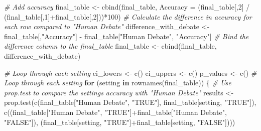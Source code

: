\documentclass[
]{article}
\newenvironment{Shaded}{\begin{snugshade}}{\end{snugshade}}
\newcommand{\AttributeTok}[1]{\textcolor[rgb]{0.77,0.63,0.00}{#1}}
\newcommand{\CommentTok}[1]{\textcolor[rgb]{0.56,0.35,0.01}{\textit{#1}}}
\newcommand{\ControlFlowTok}[1]{\textcolor[rgb]{0.13,0.29,0.53}{\textbf{#1}}}
\newcommand{\DecValTok}[1]{\textcolor[rgb]{0.00,0.00,0.81}{#1}}
\newcommand{\FunctionTok}[1]{\textcolor[rgb]{0.00,0.00,0.00}{#1}}
\newcommand{\NormalTok}[1]{#1}
\newcommand{\OtherTok}[1]{\textcolor[rgb]{0.56,0.35,0.01}{#1}}
\newcommand{\SpecialCharTok}[1]{\textcolor[rgb]{0.00,0.00,0.00}{#1}}
\newcommand{\StringTok}[1]{\textcolor[rgb]{0.31,0.60,0.02}{#1}}
\begin{document}
\begin{Shaded}
\begin{Highlighting}[]
\CommentTok{\# Add accuracy}
\NormalTok{final\_table }\OtherTok{\textless{}{-}} \FunctionTok{cbind}\NormalTok{(final\_table, }\AttributeTok{Accuracy =}\NormalTok{ (final\_table[,}\DecValTok{2}\NormalTok{] }\SpecialCharTok{/}\NormalTok{ (final\_table[,}\DecValTok{1}\NormalTok{]}\SpecialCharTok{+}\NormalTok{final\_table[,}\DecValTok{2}\NormalTok{]))}\SpecialCharTok{*}\DecValTok{100}\NormalTok{)}
\CommentTok{\# Calculate the difference in accuracy for each row compared to "Human Debate"}
\NormalTok{difference\_with\_debate }\OtherTok{\textless{}{-}}\NormalTok{ final\_table[,}\StringTok{"Accuracy"}\NormalTok{] }\SpecialCharTok{{-}}\NormalTok{ final\_table[}\StringTok{"Human Debate"}\NormalTok{, }\StringTok{"Accuracy"}\NormalTok{]}
\CommentTok{\# Bind the difference column to the final\_table}
\NormalTok{final\_table }\OtherTok{\textless{}{-}} \FunctionTok{cbind}\NormalTok{(final\_table, difference\_with\_debate)}

\CommentTok{\# Loop through each setting}
\NormalTok{ci\_lowers }\OtherTok{\textless{}{-}} \FunctionTok{c}\NormalTok{()}
\NormalTok{ci\_uppers }\OtherTok{\textless{}{-}} \FunctionTok{c}\NormalTok{()}
\NormalTok{p\_values }\OtherTok{\textless{}{-}} \FunctionTok{c}\NormalTok{()}
\CommentTok{\# Loop through each setting}
\ControlFlowTok{for}\NormalTok{ (setting }\ControlFlowTok{in} \FunctionTok{rownames}\NormalTok{(final\_table)) \{}
  \CommentTok{\# Use prop.test to compare the setting\textquotesingle{}s accuracy with "Human Debate"}
\NormalTok{  results }\OtherTok{\textless{}{-}} \FunctionTok{prop.test}\NormalTok{(}\FunctionTok{c}\NormalTok{(final\_table[}\StringTok{"Human Debate"}\NormalTok{, }\StringTok{"TRUE"}\NormalTok{], final\_table[setting, }\StringTok{"TRUE"}\NormalTok{]), }\FunctionTok{c}\NormalTok{((final\_table[}\StringTok{"Human Debate"}\NormalTok{, }\StringTok{"TRUE"}\NormalTok{]}\SpecialCharTok{+}\NormalTok{final\_table[}\StringTok{"Human Debate"}\NormalTok{, }\StringTok{"FALSE"}\NormalTok{]), (final\_table[setting, }\StringTok{"TRUE"}\NormalTok{]}\SpecialCharTok{+}\NormalTok{final\_table[setting, }\StringTok{"FALSE"}\NormalTok{])))}
  

\end{Highlighting}
\end{Shaded}
\end{document}
